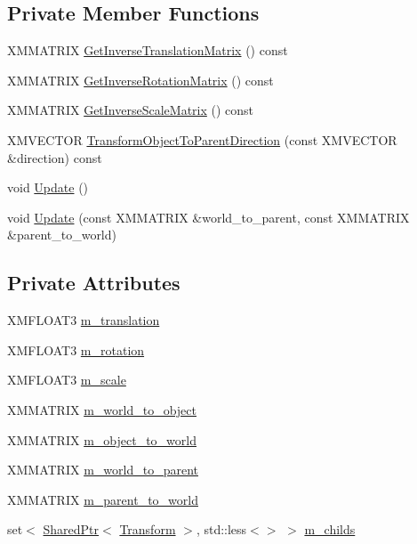 \subsection*{Private Member Functions}
\begin{DoxyCompactItemize}
\item 
X\+M\+M\+A\+T\+R\+IX \hyperlink{structmage_1_1_transform_a4cd7f7143c49772a83adfbd1d75dd475}{Get\+Inverse\+Translation\+Matrix} () const
\item 
X\+M\+M\+A\+T\+R\+IX \hyperlink{structmage_1_1_transform_a12e7ee212a9270fb3f01de9b7f5ee3b8}{Get\+Inverse\+Rotation\+Matrix} () const
\item 
X\+M\+M\+A\+T\+R\+IX \hyperlink{structmage_1_1_transform_a31da6a53e73a6254bc36cd0348c65cda}{Get\+Inverse\+Scale\+Matrix} () const
\item 
X\+M\+V\+E\+C\+T\+OR \hyperlink{structmage_1_1_transform_acc7a0f4ce2d6585fb19c1a6272cc84d2}{Transform\+Object\+To\+Parent\+Direction} (const X\+M\+V\+E\+C\+T\+OR \&direction) const
\item 
void \hyperlink{structmage_1_1_transform_ab80fc4a9bd034540b1d30242c4d9ca90}{Update} ()
\item 
void \hyperlink{structmage_1_1_transform_af0d19db352e703007c26f42a253ab2aa}{Update} (const X\+M\+M\+A\+T\+R\+IX \&world\+\_\+to\+\_\+parent, const X\+M\+M\+A\+T\+R\+IX \&parent\+\_\+to\+\_\+world)
\end{DoxyCompactItemize}
\subsection*{Private Attributes}
\begin{DoxyCompactItemize}
\item 
X\+M\+F\+L\+O\+A\+T3 \hyperlink{structmage_1_1_transform_a57e27b28e0cf85be034055a68513ad79}{m\+\_\+translation}
\item 
X\+M\+F\+L\+O\+A\+T3 \hyperlink{structmage_1_1_transform_a037b4fb338bfe79aa2ab1a2e809c40df}{m\+\_\+rotation}
\item 
X\+M\+F\+L\+O\+A\+T3 \hyperlink{structmage_1_1_transform_a25d15c85b93037bab5b755c86bef0b54}{m\+\_\+scale}
\item 
X\+M\+M\+A\+T\+R\+IX \hyperlink{structmage_1_1_transform_a873fefd93a3c1ca938e2bbecdbc5b3ac}{m\+\_\+world\+\_\+to\+\_\+object}
\item 
X\+M\+M\+A\+T\+R\+IX \hyperlink{structmage_1_1_transform_a4e227321c984ddf2ece92d7954ae5db9}{m\+\_\+object\+\_\+to\+\_\+world}
\item 
X\+M\+M\+A\+T\+R\+IX \hyperlink{structmage_1_1_transform_a1a98dc6d2852ad1a884327ad3581eb52}{m\+\_\+world\+\_\+to\+\_\+parent}
\item 
X\+M\+M\+A\+T\+R\+IX \hyperlink{structmage_1_1_transform_af8b746deb2f7128d143063f3e11bc038}{m\+\_\+parent\+\_\+to\+\_\+world}
\item 
set$<$ \hyperlink{namespacemage_a1e01ae66713838a7a67d30e44c67703e}{Shared\+Ptr}$<$ \hyperlink{structmage_1_1_transform}{Transform} $>$, std\+::less$<$$>$ $>$ \hyperlink{structmage_1_1_transform_a7c90722d5728cfcaf11f3d62b9ced11e}{m\+\_\+childs}
\end{DoxyCompactItemize}


